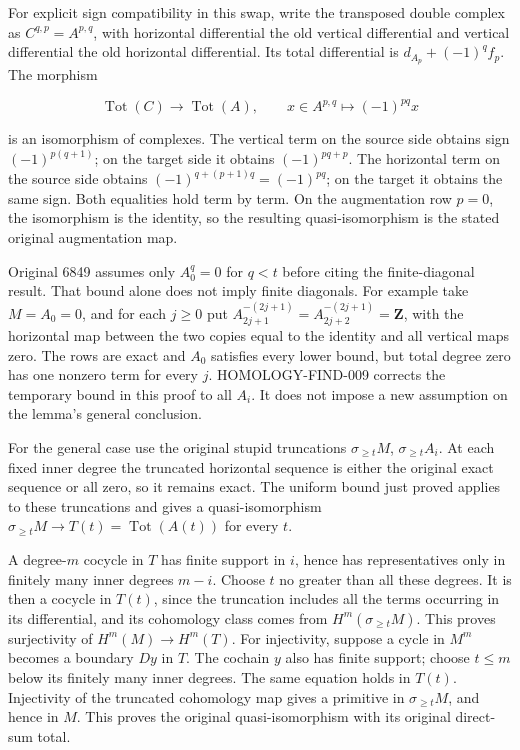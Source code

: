 For explicit sign compatibility in this swap, write the transposed double complex as \(C^{q,p}=A^{p,q}\), with horizontal differential the old vertical differential and vertical differential the old horizontal differential. Its total differential is \(d_{A_p}+(-1)^q f_p\). The morphism

\[
\operatorname{Tot}(C)\longrightarrow\operatorname{Tot}(A),\qquad
x\in A^{p,q}\longmapsto(-1)^{pq}x
\]

is an isomorphism of complexes. The vertical term on the source side obtains sign \((-1)^{p(q+1)}\); on the target side it obtains \((-1)^{pq+p}\). The horizontal term on the source side obtains \((-1)^{q+(p+1)q}=(-1)^{pq}\); on the target it obtains the same sign. Both equalities hold term by term. On the augmentation row \(p=0\), the isomorphism is the identity, so the resulting quasi-isomorphism is the stated original augmentation map.

Original 6849 assumes only \(A_0^q=0\) for \(q<t\) before citing the finite-diagonal result. That bound alone does not imply finite diagonals. For example take \(M=A_0=0\), and for each \(j\geq0\) put \(A_{2j+1}^{-(2j+1)}=A_{2j+2}^{-(2j+1)}=\mathbf Z\), with the horizontal map between the two copies equal to the identity and all vertical maps zero. The rows are exact and \(A_0\) satisfies every lower bound, but total degree zero has one nonzero term for every \(j\). HOMOLOGY-FIND-009 corrects the temporary bound in this proof to all \(A_i\). It does not impose a new assumption on the lemma's general conclusion.

For the general case use the original stupid truncations \(\sigma_{\geq t}M\), \(\sigma_{\geq t}A_i\). At each fixed inner degree the truncated horizontal sequence is either the original exact sequence or all zero, so it remains exact. The uniform bound just proved applies to these truncations and gives a quasi-isomorphism \(\sigma_{\geq t}M\to T(t)=\operatorname{Tot}(A(t))\) for every \(t\).

A degree-\(m\) cocycle in \(T\) has finite support in \(i\), hence has representatives only in finitely many inner degrees \(m-i\). Choose \(t\) no greater than all these degrees. It is then a cocycle in \(T(t)\), since the truncation includes all the terms occurring in its differential, and its cohomology class comes from \(H^m(\sigma_{\geq t}M)\). This proves surjectivity of \(H^m(M)\to H^m(T)\). For injectivity, suppose a cycle in \(M^m\) becomes a boundary \(Dy\) in \(T\). The cochain \(y\) also has finite support; choose \(t\leq m\) below its finitely many inner degrees. The same equation holds in \(T(t)\). Injectivity of the truncated cohomology map gives a primitive in \(\sigma_{\geq t}M\), and hence in \(M\). This proves the original quasi-isomorphism with its original direct-sum total.

